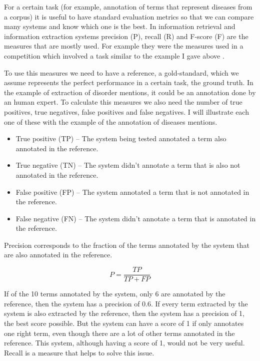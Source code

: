 For a certain task (for example, annotation of terms that represent diseases from a corpus) it is useful to have standard evaluation metrics so that we can compare many systems and know which one is the best. In information retrieval and information extraction systems precision (P), recall (R) and F-score (F) are the measures that are mostly used. For example they were the measures used in a competition which involved a task similar to the example I gave above \citep{Elhadad2015}.

To use this measures we need to have a reference, a gold-standard, which we assume represents the perfect performance in a certain task, the ground truth. In the example of extraction of disorder mentions, it could be an annotation done by an human expert. To calculate this measures we also need the number of true positives, true negatives, false positives and false negatives. I will illustrate each one of these with the example of the annotation of diseases mentions.

\begin{itemize}
\item True positive (TP) – The system being tested annotated a term also annotated in the reference. 
\item True negative (TN) – The system didn't annotate a term that is also not annotated in the reference.
\item False positive (FP) – The system annotated a term that is not annotated in the reference. 
\item False negative (FN) – The system didn't annotate a term that is annotated in the reference. 
\end{itemize}

Precision corresponds to the fraction of the terms annotated by the system that are also annotated in the reference. 

\begin{equation}
P = \frac{TP}{TP+FP}
\end{equation}

If of the 10 terms annotated by the system, only 6 are annotated by the reference, then the system has a precision of 0.6. If every term extracted by the system is also extracted by the reference, then the system has a precision of 1, the best score possible. But the system can have a score of 1 if only annotates one right term, even though there are a lot of other terms annotated in the reference. This system, although having a score of 1, would not be very useful. Recall is a measure that helps to solve this issue.

